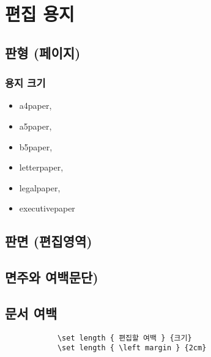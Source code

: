 
			


	
			
\newpage
\chapter{편집 용지}

		\minitoc				%


\newpage
\section{판형 (페이지)}

	\subsection{용지 크기}
	
		\begin{itemize}
			\item	a4paper, 
			\item	a5paper, 
			\item	b5paper, 
			\item	letterpaper, 
			\item	legalpaper,
			\item	executivepaper
		\end{itemize}


\newpage
\section{판면 (편집영역)}

\newpage
\section{면주와 여백문단)}

	
	
\section{문서 여백}

	
		\setlength{\fboxsep}{12pt}
		\begin{boxedminipage}[c]{1.0\linewidth}
			\begin{verbatim}
			\set length { 편집할 여백 } {크기}
			\set length { \left margin } {2cm}
			\end{verbatim} 
		\end{boxedminipage}
		


